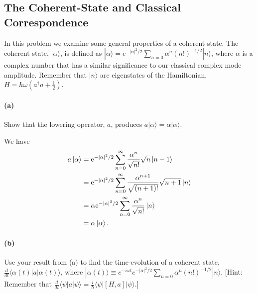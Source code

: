 \documentclass[hyperref, a4paper]{article}
\newcommand*{\ee}{\mathrm{e}}
\begin{document}
\subsection{The Coherent-State and Classical Correspondence}

In this problem we examine some general properties of a coherent state. The coherent state, $|\alpha\rangle$, is defined as $|\alpha\rangle=e^{-|\alpha|^2 / 2} \sum_{n=0} \alpha^n(n !)^{-1 / 2}|n\rangle$, where $\alpha$ is a complex number that has a similar significance to our classical complex mode amplitude. Remember that $|n\rangle$ are eigenstates of the Hamiltonian, $H=\hbar \omega\left(a^{\dagger} a+\frac{1}{2}\right)$.

\paragraph*{(a)} Show that the lowering operator, $a$, produces $a|\alpha\rangle=\alpha|\alpha\rangle$.

We have 
\begin{equation}
    \begin{aligned}
        a \ket*{\alpha} &= \ee^{- \abs*{\alpha}^2 / 2} \sum_{n=0}^{\infty} \frac{\alpha^n}{\sqrt{n!}} \sqrt{n} \ket*{n-1} \\
        &= \ee^{- \abs*{\alpha}^2 / 2} \sum_{n=0}^{\infty} \frac{\alpha^{n+1}}{\sqrt{(n+1)!}} \sqrt{n+1} \ket*{n} \\
        &= \alpha \ee^{- \abs*{\alpha}^2 / 2} \sum_{n=0}^{\infty} \frac{\alpha^{n}}{\sqrt{n!}}  \ket*{n} \\
        &= \alpha \ket*{\alpha}.
    \end{aligned}
\end{equation}

\paragraph*{(b)} Use your result from (a) to find the time-evolution of a coherent state, $\frac{d}{d t}\langle\alpha(t)|a| \alpha(t)\rangle$, where $|\alpha(t)\rangle \equiv e^{-i \omega t} e^{-|\alpha|^2 / 2} \sum_{n=0} \alpha^n(n !)^{-1 / 2}|n\rangle$.
[Hint: Remember that $\frac{d}{d t}\langle\psi|a| \psi\rangle=\frac{i}{\hbar}\langle\psi|[H, a]| \psi\rangle$.]
\end{document}
